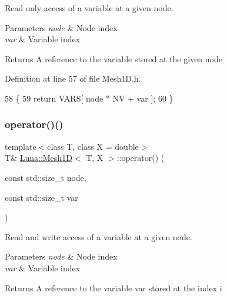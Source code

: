Read only access of a variable at a given node. 


\begin{DoxyParams}{Parameters}
{\em node} & Node index \\
\hline
{\em var} & Variable index \\
\hline
\end{DoxyParams}
\begin{DoxyReturn}{Returns}
A reference to the variable stored at the given node 
\end{DoxyReturn}


Definition at line 57 of file Mesh1\+D.\+h.


\begin{DoxyCode}
58     \{
59       \textcolor{keywordflow}{return} VARS[ node * NV + var ];
60     \}
\end{DoxyCode}
\mbox{\label{classLuna_1_1Mesh1D_ae52f29ef7e30fd3d8c1bca421b55f5d4}} 
\subsubsection{\texorpdfstring{operator()()}{operator()()}\hspace{0.1cm}{\footnotesize\ttfamily [2/2]}}
{\footnotesize\ttfamily template$<$class T, class X = double$>$ \\
T\& \hyperlink{classLuna_1_1Mesh1D}{Luna\+::\+Mesh1D}$<$ T, X $>$\+::operator() (\begin{DoxyParamCaption}\item[{const std\+::size\+\_\+t}]{node,  }\item[{const std\+::size\+\_\+t}]{var }\end{DoxyParamCaption})\hspace{0.3cm}{\ttfamily [inline]}}



Read and write access of a variable at a given node. 


\begin{DoxyParams}{Parameters}
{\em node} & Node index \\
\hline
{\em var} & Variable index \\
\hline
\end{DoxyParams}
\begin{DoxyReturn}{Returns}
A reference to the variable var stored at the index i 
\end{DoxyReturn}


